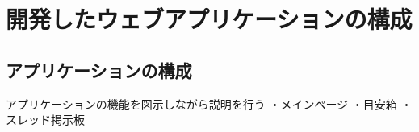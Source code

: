 \documentclass[main]{subfiles}
\begin{document}
\chapter{開発したウェブアプリケーションの構成}
\label{cha:overview}
\section{アプリケーションの構成}


アプリケーションの機能を図示しながら説明を行う
・メインページ
・目安箱
・スレッド掲示板
\end{document}
